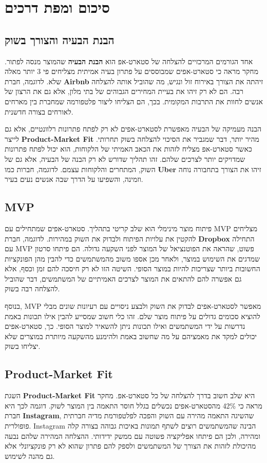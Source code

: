 \chapter{סיכום ומפת דרכים}

\section{הבנת הבעיה והצורך בשוק}
אחד הגורמים המרכזיים להצלחה של סטארט-אפ הוא \textbf{הבנת הבעיה} שהמוצר מנסה לפתור. מחקר מראה כי סטארט-אפים שמבוססים על פתרון בעיה אמיתית מצליחים פי 3 יותר מאלה שלא. לדוגמה, חברת \textbf{Airbnb} זיהתה את הצורך באירוח זול ונגיש, מה שהוביל אותה להצלחה רבה. הם לא רק זיהו את בעיית המחירים הגבוהים של בתי מלון, אלא גם את הרצון של אנשים לחוות את התרבות המקומית. בכך, הם הצליחו ליצור פלטפורמה שמחברת בין מארחים לאורחים בצורה חדשנית.

הבנה מעמיקה של הבעיה מאפשרת לסטארט-אפים לא רק לפתח פתרונות רלוונטיים, אלא גם לייצר \textbf{Product-Market Fit} מהיר יותר, דבר שמגביר את הסיכוי להצלחה בשוק תחרותי. כאשר סטארט-אפ מצליח לזהות את הכאב האמיתי של הלקוחות, הוא יכול לפתח פתרונות שמדויקים יותר לצרכים שלהם. זהו תהליך שדורש לא רק הבנה של הבעיה, אלא גם של השוק, המתחרים והלקוחות עצמם. לדוגמה, חברות כמו \textbf{Uber} זיהו את הצורך בתחבורה נוחה וזמינה, והשפיעו על הדרך שבה אנשים נעים בעיר.

\section{MVP \texorpdfstring{}{(Minimum Viable Product)}}
פיתוח מוצר מינימלי  הוא שלב קריטי בתהליך. סטארט-אפים שמתחילים עם MVP מצליחים להקטין את עלויות הפיתוח ולבדוק את השוק במהירות. לדוגמה, חברת \textbf{Dropbox} התחילה עם MVP פשוט, שהראה את הפוטנציאל של המוצר לפני השקעה גדולה. הם פיתחו סרטון שמדגים את השימוש במוצר, ולאחר מכן אספו משוב מהמשתמשים כדי להבין מהן הפונקציות החשובות ביותר שצריכות להיות במוצר הסופי. השיטה הזו לא רק חיסכה להם זמן וכסף, אלא גם אפשרה להם להתאים את המוצר לצרכים האמיתיים של המשתמשים, דבר שהוביל להצלחה רבה בשוק.

בנוסף, MVP מאפשר לסטארט-אפים לבדוק את השוק ולבצע ניסויים עם רעיונות שונים מבלי להוציא סכומים גדולים על פיתוח מוצר שלם. זהו כלי חשוב שמסייע להבין אילו תכונות באמת נדרשות על ידי המשתמשים ואילו תכונות ניתן להשאיר למוצר הסופי. כך, סטארט-אפים יכולים למקד את מאמציהם על מה שחשוב באמת ולהימנע מהשקעה מיותרת במוצרים שלא יצליחו בשוק.

\section{Product-Market Fit}
השגת \textbf{Product-Market Fit} היא שלב חשוב בדרך להצלחה של כל סטארט-אפ. מחקר מראה כי 42\% מהסטארט-אפים נכשלים בגלל חוסר התאמה בין המוצר לשוק. דוגמה לכך היא חברת \textbf{Instagram}, שהשיגה התאמה מהירה עם השוק והפכה לפלטפורמת מדיה חברתית פופולרית. Instagram הבינה שהמשתמשים רוצים לשתף תמונות באיכות גבוהה בצורה קלה ומהירה, ולכן הם פיתחו אפליקציה פשוטה עם ממשק ידידותי. ההצלחה המהירה שלהם נבעה מהיכולת לזהות את הצורך של המשתמשים ולספק להם פתרון שהוא לא רק פונקציונלי אלא גם מהנה לשימוש.

